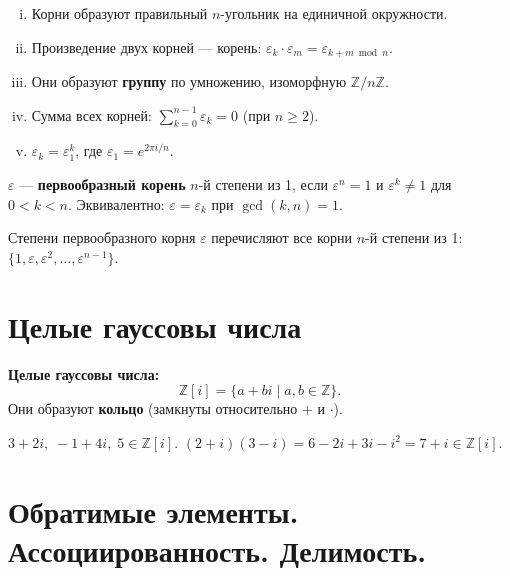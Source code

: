 \documentclass[12pt]{article}
\begin{document}
\begin{property}
\begin{enumerate}[(i)]
\item Корни образуют правильный $n$-угольник на единичной окружности.
\item Произведение двух корней --- корень: $\varepsilon_k \cdot \varepsilon_m = \varepsilon_{k+m \bmod n}$.
\item Они образуют \textbf{группу} по умножению, изоморфную $\mathbb{Z}/n\mathbb{Z}$.
\item Сумма всех корней: $\sum_{k=0}^{n-1} \varepsilon_k = 0$ (при $n \geq 2$).
\item $\varepsilon_k = \varepsilon_1^k$, где $\varepsilon_1 = e^{2\pi i/n}$.
\end{enumerate}
\end{property}

\begin{definition}
$\varepsilon$ --- \textbf{первообразный корень} $n$-й степени из 1,
если $\varepsilon^n = 1$ и $\varepsilon^k \neq 1$ для $0 < k < n$.
Эквивалентно: $\varepsilon = \varepsilon_k$ при $\gcd(k,n) = 1$.
\end{definition}

\begin{property}
Степени первообразного корня $\varepsilon$ перечисляют все корни $n$-й
степени из 1: $\{1, \varepsilon, \varepsilon^2, \ldots, \varepsilon^{n-1}\}$.
\end{property}

\section{Целые гауссовы числа}

\begin{definition}
\textbf{Целые гауссовы числа:}
\[
\mathbb{Z}[i] = \{a + bi \mid a, b \in \mathbb{Z}\}.
\]
Они образуют \textbf{кольцо} (замкнуты относительно $+$ и $\cdot$).
\end{definition}

\begin{example}
$3 + 2i,\; -1 + 4i,\; 5 \in \mathbb{Z}[i]$.
$(2+i)(3-i) = 6 - 2i + 3i - i^2 = 7 + i \in \mathbb{Z}[i]$.
\end{example}

\section{Обратимые элементы. Ассоциированность. Делимость.}
\end{document}
